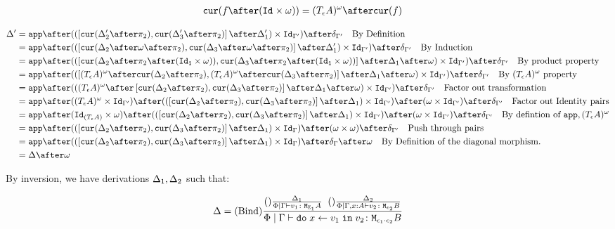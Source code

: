 \documentclass{report}
\begin{document}
    \begin{align}
        \cur{f\after(\Id{}\times \w)} & = (\tea)^{\w} \after\cur{f}
    \end{align}

    \begin{align}
        \D' & =\app\after((\fld{\cur{\D_2'\after\pp}}{\cur{\D_3'\after\pp}}\after\D_1')\times \Id{\G'})\after\diag{\G'}\qt{By Definition}\\
        & =\app\after((\fld{\cur{\D_2\after\w\after\pp}}{\cur{\D_3\after\w\after\pp}}\after\D_1')\times \Id{\G'})\after\diag{\G'}\qt{By Induction}\\
        & = \app\after((\fld{\cur{\D_2\after\pp\after(\Id{\1}\times \w)}}{\cur{\D_3\after\pp\after(\Id{\1}\times \w)}}\after\D_1\after\w)\times \Id{\G'})\after\diag{\G'}\qt{By product property}\\
        & = \app\after((\fld{(\tea)^{\w}\after\cur{\D_2\after\pp}}{(\tea)^{\w}\after\cur{\D_3\after\pp}}\after\D_1\after\w)\times \Id{\G'})\after\diag{\G'}\qt{By $(\tea)^{\w}$ property}\\
        & = \app\after(((\tea)^{\w}\after\fld{\cur{\D_2\after\pp}}{\cur{\D_3\after\pp}}\after\D_1\after\w)\times \Id{\G'})\after\diag{\G'}\qt{Factor out transformation}\\
        & = \app\after((\tea)^{\w}\times\Id{\G'})\after((\fld{\cur{\D_2\after\pp}}{\cur{\D_3\after\pp}}\after\D_1)\times \Id{\G'})\after(\w \times \Id{\G'})\after\diag{\G'}\qt{Factor out Identity pairs}\\
        & = \app\after(\Id{(\tea)}\times\w)\after((\fld{\cur{\D_2\after\pp}}{\cur{\D_3\after\pp}}\after\D_1) \times \Id{\G'})\after(\w \times \Id{\G'})\after\diag{\G'}\qt{By defintion of $\app, (\tea)^{\w}$}\\
        & = \app\after((\fld{\cur{\D_2\after\pp}}{\cur{\D_3\after\pp}}\after\D_1)\times \idg)\after(\w \times \w)\after\diag{\G'}\qt{Push through pairs}\\
        & = \app\after((\fld{\cur{\D_2\after\pp}}{\cur{\D_3\after\pp}}\after\D_1)\times \idg)\after\diag{\G}\after\w\qt{By Definition of the diagonal morphism.}\\
        & = \D\after\w
    \end{align}

    By inversion, we have derivations $\Delta_1, \Delta_2$ such that:


    \begin{equation}
        \Delta = (\text{Bind}) \frac{
            (\text{}) \frac{\Delta_1}{\Phi\mid\Gamma \vdash v_1 \colon \texttt{M}_{\mathbb{E}_1}{A}}
            \;\;
            (\text{}) \frac{\Delta_2}{\Phi\mid\Gamma,x: A \vdash v_2 \colon \texttt{M}_{\epsilon_2}{B}}
        }{
            \Phi\mid\Gamma \vdash \texttt{do}\; x \leftarrow v_1 \;\texttt{in}\; v_2 \colon \texttt{M}_{\epsilon_1\cdot\epsilon_2}{B}
        }
    \end{equation}
\end{document}
